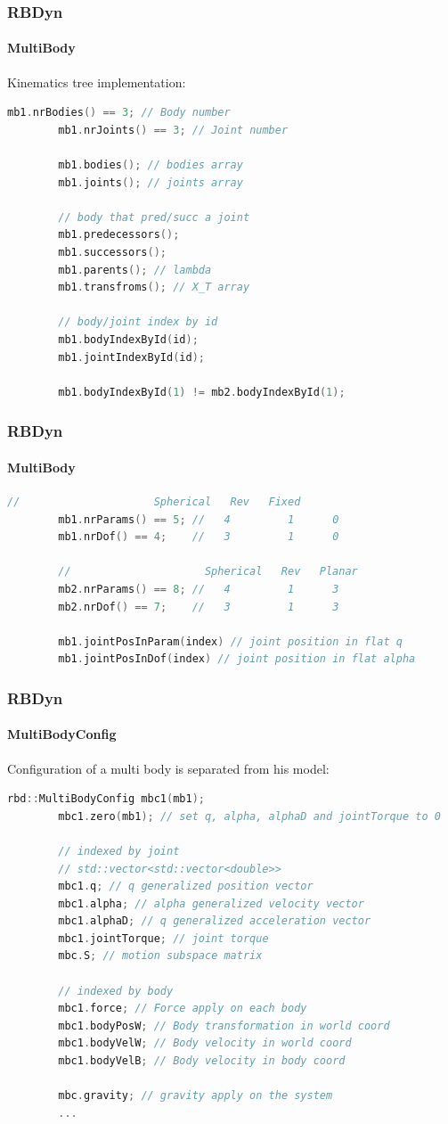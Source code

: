 \documentclass{beamer}
\begin{document}
\begin{frame}[fragile]
	\frametitle{RBDyn}
	\framesubtitle{MultiBody}
	Kinematics tree implementation:
	\begin{lstlisting}[language=C++]
		mb1.nrBodies() == 3; // Body number
		mb1.nrJoints() == 3; // Joint number

		mb1.bodies(); // bodies array
		mb1.joints(); // joints array

		// body that pred/succ a joint
		mb1.predecessors();
		mb1.successors();
		mb1.parents(); // lambda
		mb1.transfroms(); // X_T array

		// body/joint index by id
		mb1.bodyIndexById(id);
		mb1.jointIndexById(id);

		mb1.bodyIndexById(1) != mb2.bodyIndexById(1);
	\end{lstlisting}
\end{frame}
\begin{frame}[fragile]
	\frametitle{RBDyn}
	\framesubtitle{MultiBody}
	\begin{lstlisting}[language=C++]
		//                     Spherical   Rev   Fixed
		mb1.nrParams() == 5; //   4         1      0
		mb1.nrDof() == 4;    //   3         1      0

		//                     Spherical   Rev   Planar
		mb2.nrParams() == 8; //   4         1      3
		mb2.nrDof() == 7;    //   3         1      3

		mb1.jointPosInParam(index) // joint position in flat q
		mb1.jointPosInDof(index) // joint position in flat alpha
	\end{lstlisting}
\end{frame}

\begin{frame}[fragile]
	\frametitle{RBDyn}
	\framesubtitle{MultiBodyConfig}
	Configuration of a multi body is separated from his model:
	\begin{lstlisting}[language=C++]
		rbd::MultiBodyConfig mbc1(mb1);
		mbc1.zero(mb1); // set q, alpha, alphaD and jointTorque to 0

		// indexed by joint
		// std::vector<std::vector<double>>
		mbc1.q; // q generalized position vector
		mbc1.alpha; // alpha generalized velocity vector
		mbc1.alphaD; // q generalized acceleration vector
		mbc1.jointTorque; // joint torque
		mbc.S; // motion subspace matrix

		// indexed by body
		mbc1.force; // Force apply on each body
		mbc1.bodyPosW; // Body transformation in world coord
		mbc1.bodyVelW; // Body velocity in world coord
		mbc1.bodyVelB; // Body velocity in body coord

		mbc.gravity; // gravity apply on the system
		...
	\end{lstlisting}
\end{frame}
\end{document}
